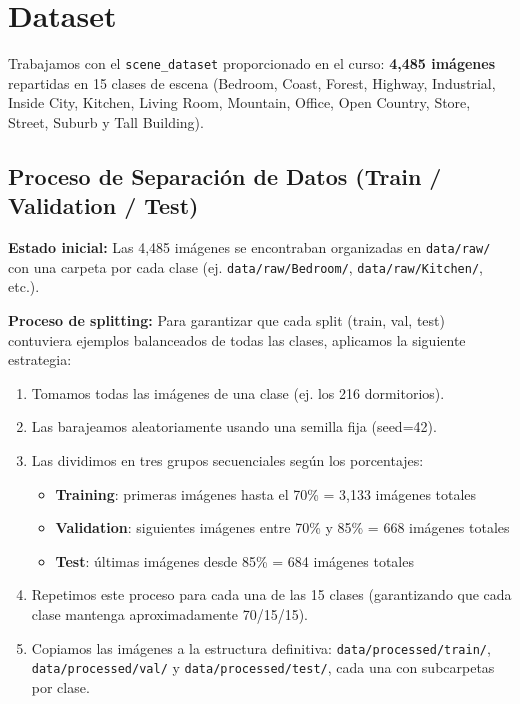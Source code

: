 \documentclass[11pt,a4paper]{article}
\begin{document}
\section{Dataset}

Trabajamos con el \texttt{scene\_dataset} proporcionado en el curso: \textbf{4,485 imágenes} repartidas en 15 clases de escena (Bedroom, Coast, Forest, Highway, Industrial, Inside City, Kitchen, Living Room, Mountain, Office, Open Country, Store, Street, Suburb y Tall Building).

\subsection{Proceso de Separación de Datos (Train / Validation / Test)}

\textbf{Estado inicial:} Las 4,485 imágenes se encontraban organizadas en \texttt{data/raw/} con una carpeta por cada clase (ej. \texttt{data/raw/Bedroom/}, \texttt{data/raw/Kitchen/}, etc.).

\textbf{Proceso de splitting:} Para garantizar que cada split (train, val, test) contuviera ejemplos balanceados de todas las clases, aplicamos la siguiente estrategia:

\begin{enumerate}
    \item Tomamos todas las imágenes de una clase (ej. los 216 dormitorios).
    \item Las barajeamos aleatoriamente usando una semilla fija (seed=42).
    \item Las dividimos en tres grupos secuenciales según los porcentajes:
    \begin{itemize}
        \item \textbf{Training}: primeras imágenes hasta el 70\% = 3,133 imágenes totales
        \item \textbf{Validation}: siguientes imágenes entre 70\% y 85\% = 668 imágenes totales
        \item \textbf{Test}: últimas imágenes desde 85\% = 684 imágenes totales
    \end{itemize}
    \item Repetimos este proceso para cada una de las 15 clases (garantizando que cada clase mantenga aproximadamente 70/15/15).
    \item Copiamos las imágenes a la estructura definitiva: \texttt{data/processed/train/}, \texttt{data/processed/val/} y \texttt{data/processed/test/}, cada una con subcarpetas por clase.
\end{enumerate}
\end{document}
